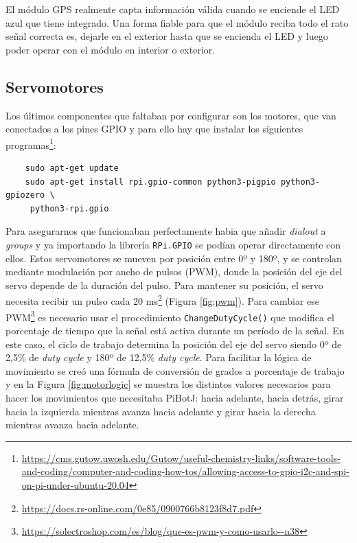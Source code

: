 El módulo GPS realmente capta información válida cuando se enciende el LED azul que tiene integrado. Una forma fiable para que el módulo reciba todo el rato señal correcta es, dejarle en el exterior hasta que se encienda el LED y luego poder operar con el módulo en interior o exterior. 


\subsection{Servomotores}
\label{subsec:configmotores}

Los últimos componentes que faltaban por configurar son los motores, que van conectados a los pines GPIO y para ello hay que instalar los siguientes programas\footnote{\url{https://cms.gutow.uwosh.edu/Gutow/useful-chemistry-links/software-tools-and-coding/computer-and-coding-how-tos/allowing-access-to-gpio-i2c-and-spi-on-pi-under-ubuntu-20.04}}: 

\begin{verbatim}
	sudo apt-get update
	sudo apt-get install rpi.gpio-common python3-pigpio python3-gpiozero \
	 python3-rpi.gpio
\end{verbatim}

Para asegurarnos que funcionaban perfectamente habia que añadir \textit{dialout} a \textit{groups} y ya importando la librería \verb|RPi.GPIO| se podían operar directamente con ellos. Estos servomotores se mueven por posición entre 0º y 180º, y se controlan mediante modulación por ancho de pulsos (\ac{PWM}), donde la posición del eje del servo depende de la duración del pulso. Para mantener su posición, el servo necesita recibir un pulso cada 20 ms\footnote{\url{https://docs.rs-online.com/0e85/0900766b8123f8d7.pdf}} (Figura \ref{fig:pwm}). Para cambiar ese \ac{PWM}\footnote{\url{https://solectroshop.com/es/blog/que-es-pwm-y-como-usarlo--n38}} es necesario usar el procedimiento \verb|ChangeDutyCycle()| que modifica el porcentaje de tiempo que la señal está activa durante un período de la señal. En este caso, el ciclo de trabajo determina la posición del eje del servo siendo 0º de 2,5\% de \textit{duty cycle} y 180º de 12,5\% \textit{duty cycle}. Para facilitar la lógica de movimiento se creó una fórmula de conversión de grados a porcentaje de trabajo y en la Figura \ref{fig:motorlogic} se muestra los distintos valores necesarios para hacer los movimientos que necesitaba PiBotJ: hacia adelante, hacia detrás, girar hacia la izquierda mientras avanza hacia adelante y girar hacia la derecha mientras avanza hacia adelante.

